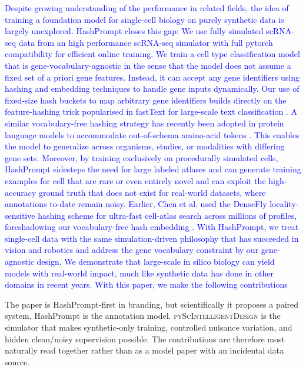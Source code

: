 \documentclass{article}
\newcommand{\phflo}[1]{\textcolor{blue}{#1}}
\begin{document}
\phflo{Despite growing understanding of the performance in related fields, the idea of training a foundation model for single-cell biology on purely synthetic data is largely unexplored. 
HashPrompt closes this gap: We use fully simulated scRNA-seq data from an high performance scRNA-seq simulator with full pytorch compatibility for efficient online training. We train a cell type classification model that is gene-vocabulary-agnostic in the sense that the model does not assume a fixed set of  a priori gene features. Instead, it can accept any gene identifiers using hashing and embedding techniques to handle gene inputs dynamically. Our use of fixed-size hash buckets to map arbitrary gene identifiers builds directly on the feature-hashing trick popularised in fastText for large-scale text classification \cite{joulin2017bag}. A similar vocabulary-free hashing strategy has recently been adopted in protein language models to accommodate out-of-schema amino-acid tokens \cite{nijkamp2023protbert}.
This enables the model to generalize across organisms, studies, or modalities with differing gene sets. Moreover, by training exclusively on procedurally simulated cells, HashPrompt sidesteps the need for large labeled atlases and can generate training examples for cell   that are rare or even entirely novel and can exploit the high-accuracy ground truth that does not exist for real-world datasets, where annotations to-date remain noisy.
Earlier, Chen et al. used the DenseFly locality-sensitive hashing scheme for ultra-fast cell-atlas search across millions of profiles, foreshadowing our vocabulary-free hash embedding \cite{chen2020using}.
With HashPrompt, we treat single-cell data with the same simulation-driven philosophy that has succeeded in vision and robotics and address the gene vocabulary constraint by our gene-agnostic design. 
We demonstrate that large-scale in silico biology can yield models with real-world impact, much like synthetic data has done in other domains in recent years. 
With this paper, we make the following contributions
}

The paper is HashPrompt-first in branding, but scientifically it proposes a paired system. HashPrompt is the annotation model. \textsc{pyScIntelligentDesign} is the simulator that makes synthetic-only training, controlled nuisance variation, and hidden clean/noisy supervision possible. The contributions are therefore most naturally read together rather than as a model paper with an incidental data source.
\end{document}
